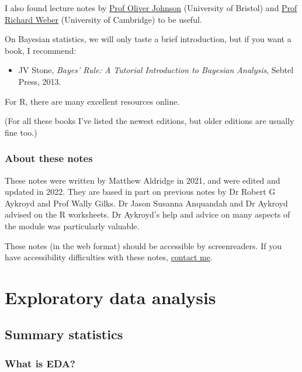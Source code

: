 \documentclass[
  letterpaper,
]{report}
\providecommand{\tightlist}{%
  \setlength{\itemsep}{0pt}\setlength{\parskip}{0pt}}\usepackage{longtable,booktabs,array}
\theoremstyle{definition}
\theoremstyle{definition}
\theoremstyle{remark}
\begin{document}
I also found lecture notes by
\href{https://people.maths.bris.ac.uk/~maotj/teaching.html}{Prof Oliver
Johnson} (University of Bristol) and
\href{http://www.statslab.cam.ac.uk/~rrw1/prob/index.html}{Prof Richard
Weber} (University of Cambridge) to be useful.

On Bayesian statistics, we will only taste a brief introduction, but if
you want a book, I recommend:

\begin{itemize}
\tightlist
\item
  JV Stone, \emph{Bayes' Rule: A Tutorial Introduction to Bayesian
  Analysis}, Sebtel Press, 2013.
\end{itemize}

For R, there are many excellent resources online.

(For all these books I've listed the newest editions, but older editions
are usually fine too.)

\hypertarget{about-notes}{%
\section*{About these notes}\label{about-notes}}


These notes were written by Matthew Aldridge in 2021, and were edited
and updated in 2022. They are based in part on previous notes by Dr
Robert G Aykroyd and Prof Wally Gilks. Dr Jason Susanna Anquandah and Dr
Aykroyd advised on the R worksheets. Dr Aykroyd's help and advice on
many aspects of the module was particularly valuable.

These notes (in the web format) should be accessible by screenreaders.
If you have accessibility difficulties with these notes,
\href{mailto:m.aldridge@leeds.ac.uk}{contact me}.

\part{Exploratory data analysis}

\hypertarget{sec-L01-stats}{%
\chapter{Summary statistics}\label{sec-L01-stats}}

\hypertarget{what-is-eda}{%
\section{What is EDA?}\label{what-is-eda}}
\end{document}
